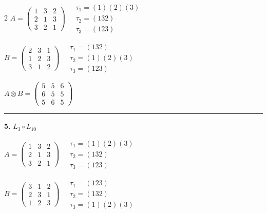 \begin{multicols}{2}
$A = \begin{pmatrix} 1 & 3 & 2 \\ 2 & 1 & 3 \\ 3 & 2 & 1 \end{pmatrix} \quad \begin{matrix} \tau_{1}=(1)(2)(3) \\ \tau_{2}=(1 3 2) \\ \tau_{3}=(1 2 3) \end{matrix}$

$B = \begin{pmatrix} 2 & 3 & 1 \\ 1 & 2 & 3 \\ 3 & 1 & 2 \end{pmatrix} \quad \begin{matrix} \tau_{1}=(1 3 2) \\ \tau_{2}=(1)(2)(3) \\ \tau_{3}=(1 2 3) \end{matrix}$

$A \otimes B = \begin{pmatrix} 5 & 5 & 6 \\ 6 & 5 & 5 \\ 5 & 6 & 5 \end{pmatrix}$

\vspace{0.3em}
\hrule
\vspace{0.3em}

\noindent\textbf{5.} $L_{3} \circ L_{10}$

$A = \begin{pmatrix} 1 & 3 & 2 \\ 2 & 1 & 3 \\ 3 & 2 & 1 \end{pmatrix} \quad \begin{matrix} \tau_{1}=(1)(2)(3) \\ \tau_{2}=(1 3 2) \\ \tau_{3}=(1 2 3) \end{matrix}$

$B = \begin{pmatrix} 3 & 1 & 2 \\ 2 & 3 & 1 \\ 1 & 2 & 3 \end{pmatrix} \quad \begin{matrix} \tau_{1}=(1 2 3) \\ \tau_{2}=(1 3 2) \\ \tau_{3}=(1)(2)(3) \end{matrix}$


\end{multicols}
